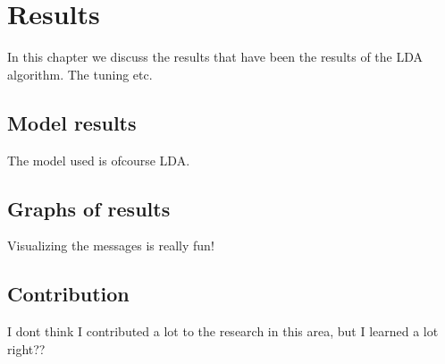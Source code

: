 \chapter{Results}
\label{ch:result}

In this chapter we discuss the results that have been the results of the LDA algorithm. The tuning etc.

\section{Model results}
The model used is ofcourse LDA.

\section{Graphs of results}
Visualizing the messages is really fun!

\section{Contribution}
I dont think I contributed a lot to the research in this area, but I learned a lot right??